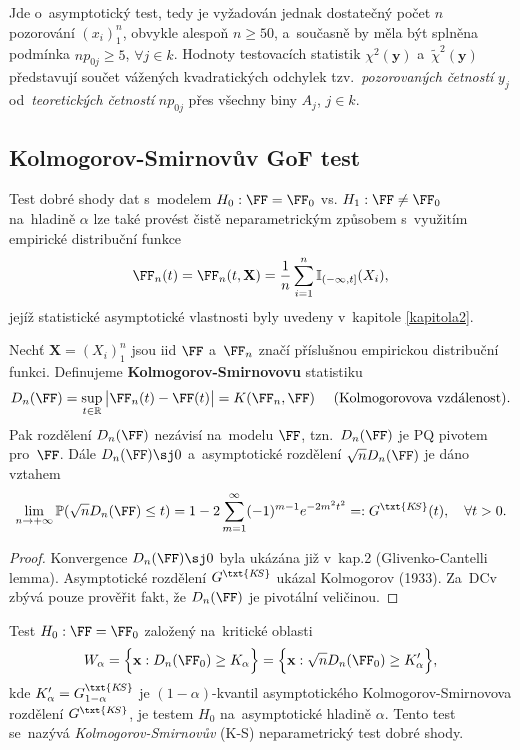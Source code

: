 Jde o~asymptotický test, tedy je vyžadován jednak dostatečný počet $n$ pozorování $(x_i)_1^n$, obvykle alespoň $n\geqslant 50$, a~současně by měla být splněna podmínka $np_{0j}\geqslant 5$, $\forall j\in\widehat k$. Hodnoty testovacích statistik $\chi^2(\mathbf y)$ a~$\widetilde\chi^2(\mathbf y)$ představují součet vážených kvadratických odchylek tzv.\ \emph{pozorovaných četností} $y_j$ od~\emph{teoretických četností} $np_{0j}$ přes všechny biny $A_j$, $j\in\widehat k$.

\subsection*{Kolmogorov-Smirnovův GoF test}
Test dobré shody dat s~modelem $ H_0: \FF=\FF_0$ vs. $H_1: \FF\neq \FF_0$ na~hladině $\alpha$ lze také provést čistě neparametrickým způsobem s~využitím empirické distribuční funkce $$\FF_n(t)=\FF_n(t,\mathbf X)=\frac{1}{n}\sum_{i=1}^n \mathbb{I}_{(-\infty,t]}(X_i),$$ jejíž statistické asymptotické vlastnosti byly uvedeny v~kapitole \ref{kapitola2}.

\begin{theorem}
	Nechť $\mathbf X=(X_i)_1^n$ jsou iid $\FF$ a~$\FF_n$ značí příslušnou empirickou distribuční funkci. Definujeme \textbf{Kolmogorov-Smirnovovu} statistiku
	$$ D_n(\FF)=\sup_{t\in\mathbb R}\big| \FF_n(t)-\FF(t) \big|= K(\FF_n,\FF) \quad\text{ (Kolmogorovova vzdálenost)}.$$
	Pak rozdělení $D_n(\FF)$ nezávisí na~modelu $\FF$, tzn.\ $D_n(\FF)$ je PQ pivotem pro~$\FF$. Dále $D_n(\FF)\sj 0$ a~asymptotické rozdělení $\sqrt{n}D_n(\FF)$ je dáno vztahem
	$$ \lim_{n\to+\infty} \mathbb P(\sqrt{n}D_n(\FF)\leq t)=1-2\sum_{m=1}^\infty (-1)^{m-1} e^{-2m^2t^2} =: G^{\txt{K\!S}}(t), \quad\forall t>0.$$
\end{theorem}

\begin{proof}
	Konvergence $D_n(\FF)\sj 0$ byla ukázána již v~kap.2 (Glivenko-Cantelli lemma).
	Asymptotické rozdělení $G^{\txt{K\!S}}$ ukázal Kolmogorov (1933). Za~DCv zbývá pouze prověřit fakt, že $D_n(\FF)$ je pivotální veličinou.
\end{proof}

\begin{dusl}
	Test $H_0: \FF=\FF_0$ založený na~kritické oblasti
	$$ W_\alpha = \Big\{ \mathbf x: D_n(\FF_0)\geq K_\alpha\Big\} = \Big\{ \mathbf x: \sqrt{n}D_n(\FF_0)\geq K'_\alpha\Big\},$$
	kde $K'_\alpha=G_{1-\alpha}^{\txt{K\!S}}$ je $(1-\alpha)$-kvantil asymptotického Kolmogorov-Smirnovova rozdělení $G^{\txt{K\!S}}$, je testem $H_0$ na~asymptotické hladině $\alpha$. Tento test se~nazývá \emph{Kolmogorov-Smirnovův} (K-S) neparametrický test dobré shody.
\end{dusl}


